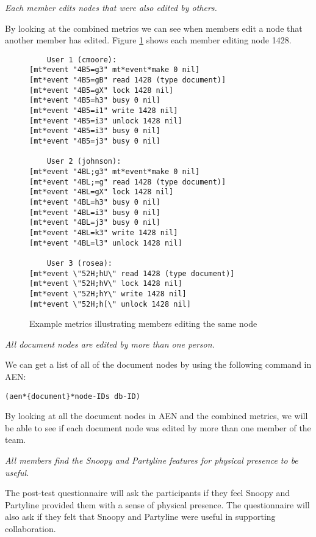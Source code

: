 \begin{itemizenoindent}
\item{\em Each member edits nodes that were also edited by others.}

  By looking at the combined metrics we can see when members edit a node that
  another member has edited.  Figure \ref{fig:trading} shows each member
  editing node 1428.

\begin{figure}[htb]
  \small
  \begin{verbatim}
    User 1 (cmoore):
[mt*event "4B5=g3" mt*event*make 0 nil]
[mt*event "4B5=gB" read 1428 (type document)]
[mt*event "4B5=gX" lock 1428 nil]
[mt*event "4B5=h3" busy 0 nil]
[mt*event "4B5=i1" write 1428 nil]
[mt*event "4B5=i3" unlock 1428 nil]
[mt*event "4B5=i3" busy 0 nil]
[mt*event "4B5=j3" busy 0 nil]

    User 2 (johnson):
[mt*event "4BL;g3" mt*event*make 0 nil]
[mt*event "4BL;=g" read 1428 (type document)]
[mt*event "4BL=gX" lock 1428 nil]
[mt*event "4BL=h3" busy 0 nil]
[mt*event "4BL=i3" busy 0 nil]
[mt*event "4BL=j3" busy 0 nil]
[mt*event "4BL=k3" write 1428 nil]
[mt*event "4BL=l3" unlock 1428 nil]

    User 3 (rosea):
[mt*event \"52H;hU\" read 1428 (type document)]
[mt*event \"52H;hV\" lock 1428 nil]
[mt*event \"52H;hY\" write 1428 nil]
[mt*event \"52H;h[\" unlock 1428 nil]
  \end{verbatim}
  \normalsize
  \caption{Example metrics illustrating members editing the same node}
  \label{fig:trading}
\end{figure}

\item{\em All document nodes are edited by more than one person.}

  We can get a list of all of the document nodes by using the following
  command in AEN:
  \begin{verbatim}
(aen*{document}*node-IDs db-ID)
  \end{verbatim}
  By looking at all the document nodes in AEN and the combined metrics,
  we will be able to see if each document node was edited by more than
  one member of the team.

\item{\em All members find the Snoopy and Partyline features for physical
  presence to be useful.}

  The post-test questionnaire will ask the participants if they feel Snoopy
  and Partyline provided them with a sense of physical presence.  The
  questionnaire will also ask if they felt that Snoopy and Partyline were
  useful in supporting collaboration.


\end{itemizenoindent}
